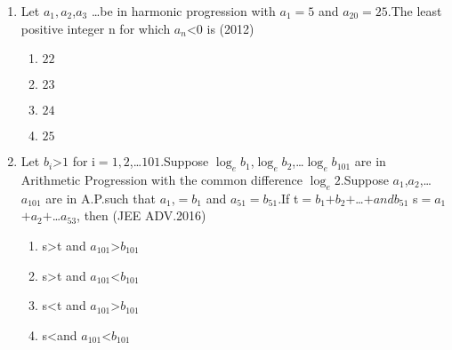 \documentclass[journal,12pt,twocolumn]{IEEEtran}
\theoremstyle{remark}
\begin{document}
\begin{enumerate} [start=5]
\begin{enumerate}
        \item $\frac{n\brak{4n^2+1}c^2}{3}$
        \item $\frac{n\brak{4n^2-1}c^2}{3}$
        \item $\frac{n\brak{4n^2+1}c^2}{6}$
    \end{enumerate}
    \item Let $a_{1}$$,a_{2}$,$a_{3}$ \dots be in harmonic progression with $a_{1}$$=$$5$ and $a_{20}$$=$$25$.The least positive integer n for which $a_{n}$\textless$0$ is
    \hfill(2012)
    \begin{enumerate}
        \item $22$
        \item $23$
        \item $24$
        \item $25$
    \end{enumerate}
    \item Let $b_{i}$\textgreater$1$ for i$=$$1,2$,\dots$101$.Suppose $\log_eb_{1}$,$\log_eb_{2}$,\dots$\log_eb_{101}$ are in Arithmetic Progression  with the common difference $\log_e2$.Suppose $a_{1}$,$a_{2}$,\dots$a_{101}$ are in A.P.such that $a_{1}$,$=$$b_{1}$ and $a_{51}$$=$$b_{51}$.If t$=$$b_{1}$$+$$b_{2}$$+$\dots$+$$ and b_{51}$ s$=$$a_{1}$$+$$a_{2}$$+$\dots$a_{53}$, then 
    \hfill(JEE ADV.2016)
    \begin{enumerate}
        \item s\textgreater t and $a_{101}$\textgreater$b_{101}$
        \item s\textgreater t and $a_{101}$\textless$b_{101}$
        \item s\textless t and $a_{101}$\textgreater$b_{101}$
        \item s\textless and $a_{101}$\textless$b_{101}$
    \end{enumerate}
    
\end{enumerate}




    
\end{document}
